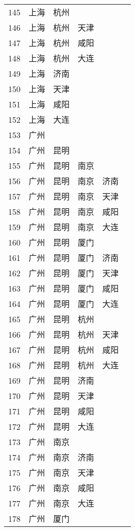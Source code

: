 \begin{footnotesize}
\begin{longtable}{cccccc}
        145	& 上海  & 杭州 \\
        146	& 上海  & 杭州  & 天津 \\
        147	& 上海  & 杭州  & 咸阳 \\
        148	& 上海  & 杭州  & 大连 \\
        149	& 上海  & 济南 \\
        150	& 上海  & 天津 \\
        151	& 上海  & 咸阳 \\
        152	& 上海  & 大连 \\
        153	& 广州 \\
        154	& 广州  & 昆明 \\
        155	& 广州  & 昆明  & 南京 \\
        156	& 广州  & 昆明  & 南京  & 济南 \\
        157	& 广州  & 昆明  & 南京  & 天津 \\
        158	& 广州  & 昆明  & 南京  & 咸阳 \\
        159	& 广州  & 昆明  & 南京  & 大连 \\
        160	& 广州  & 昆明  & 厦门 \\
        161	& 广州  & 昆明  & 厦门  & 济南 \\
        162	& 广州  & 昆明  & 厦门  & 天津 \\
        163	& 广州  & 昆明  & 厦门  & 咸阳 \\
        164	& 广州  & 昆明  & 厦门  & 大连 \\
        165	& 广州  & 昆明  & 杭州 \\
        166	& 广州  & 昆明  & 杭州  & 天津 \\
        167	& 广州  & 昆明  & 杭州  & 咸阳 \\
        168	& 广州  & 昆明  & 杭州  & 大连 \\
        169	& 广州  & 昆明  & 济南 \\
        170	& 广州  & 昆明  & 天津 \\
        171	& 广州  & 昆明  & 咸阳 \\
        172	& 广州  & 昆明  & 大连 \\
        173	& 广州  & 南京 \\
        174	& 广州  & 南京  & 济南 \\
        175	& 广州  & 南京  & 天津 \\
        176	& 广州  & 南京  & 咸阳 \\
        177	& 广州  & 南京  & 大连 \\
        178	& 广州  & 厦门 \\

\end{longtable}
\end{footnotesize}
